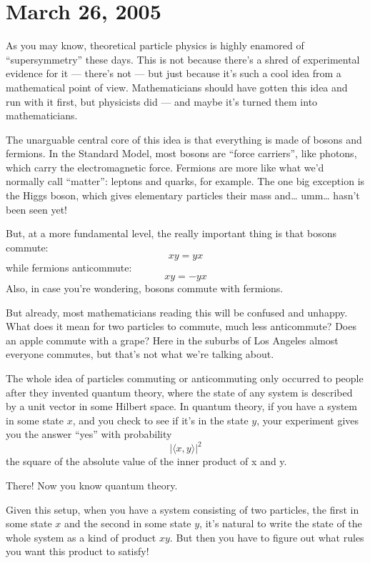 \documentclass{article}
\begin{document}
\hypertarget{week212}{%
\section{March 26, 2005}\label{week212}}

As you may know, theoretical particle physics is highly enamored of
``supersymmetry'' these days. This is not because there's a shred of
experimental evidence for it --- there's not --- but just because it's
such a cool idea from a mathematical point of view. Mathematicians
should have gotten this idea and run with it first, but physicists did
--- and maybe it's turned them into mathematicians.

The unarguable central core of this idea is that everything is made of
bosons and fermions. In the Standard Model, most bosons are ``force
carriers'', like photons, which carry the electromagnetic force.
Fermions are more like what we'd normally call ``matter'': leptons and
quarks, for example. The one big exception is the Higgs boson, which
gives elementary particles their mass and\ldots{} umm\ldots{} hasn't
been seen yet!

But, at a more fundamental level, the really important thing is that
bosons commute: \[xy = yx\] while fermions anticommute: \[xy = -yx\]
Also, in case you're wondering, bosons commute with fermions.

But already, most mathematicians reading this will be confused and
unhappy. What does it mean for two particles to commute, much less
anticommute? Does an apple commute with a grape? Here in the suburbs of
Los Angeles almost everyone commutes, but that's not what we're talking
about.

The whole idea of particles commuting or anticommuting only occurred to
people after they invented quantum theory, where the state of any system
is described by a unit vector in some Hilbert space. In quantum theory,
if you have a system in some state \(x\), and you check to see if it's
in the state \(y\), your experiment gives you the answer ``yes'' with
probability \[|\langle x,y\rangle|^2\] the square of the absolute value
of the inner product of x and y.

There! Now you know quantum theory.

Given this setup, when you have a system consisting of two particles,
the first in some state \(x\) and the second in some state \(y\), it's
natural to write the state of the whole system as a kind of product
\(xy\). But then you have to figure out what rules you want this product
to satisfy!
\end{document}

